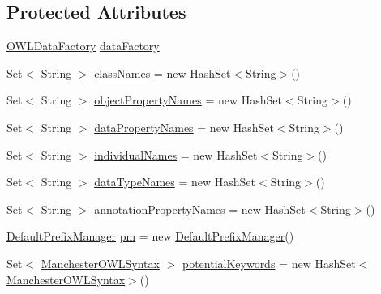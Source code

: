 \subsection*{Protected Attributes}
\begin{DoxyCompactItemize}
\item 
\hyperlink{interfaceorg_1_1semanticweb_1_1owlapi_1_1model_1_1_o_w_l_data_factory}{O\-W\-L\-Data\-Factory} \hyperlink{classorg_1_1coode_1_1owlapi_1_1manchesterowlsyntax_1_1_manchester_o_w_l_syntax_editor_parser_a6ed6a350d1607a65f8e3cda16cbbd3ca}{data\-Factory}
\item 
Set$<$ String $>$ \hyperlink{classorg_1_1coode_1_1owlapi_1_1manchesterowlsyntax_1_1_manchester_o_w_l_syntax_editor_parser_ac2ca29eba11aa2774f9d418efcf2a822}{class\-Names} = new Hash\-Set$<$String$>$()
\item 
Set$<$ String $>$ \hyperlink{classorg_1_1coode_1_1owlapi_1_1manchesterowlsyntax_1_1_manchester_o_w_l_syntax_editor_parser_adaac3c2c8be2c97a554f2323070d7932}{object\-Property\-Names} = new Hash\-Set$<$String$>$()
\item 
Set$<$ String $>$ \hyperlink{classorg_1_1coode_1_1owlapi_1_1manchesterowlsyntax_1_1_manchester_o_w_l_syntax_editor_parser_abc430c7ea3d59c3cbe2691937e034d05}{data\-Property\-Names} = new Hash\-Set$<$String$>$()
\item 
Set$<$ String $>$ \hyperlink{classorg_1_1coode_1_1owlapi_1_1manchesterowlsyntax_1_1_manchester_o_w_l_syntax_editor_parser_a0335c7a3b25dcbc964c0533b8c14530d}{individual\-Names} = new Hash\-Set$<$String$>$()
\item 
Set$<$ String $>$ \hyperlink{classorg_1_1coode_1_1owlapi_1_1manchesterowlsyntax_1_1_manchester_o_w_l_syntax_editor_parser_a441bbd618ac6df19f112b5de88f98ff2}{data\-Type\-Names} = new Hash\-Set$<$String$>$()
\item 
Set$<$ String $>$ \hyperlink{classorg_1_1coode_1_1owlapi_1_1manchesterowlsyntax_1_1_manchester_o_w_l_syntax_editor_parser_a98b7e364e39aba43494254739e4ef1dd}{annotation\-Property\-Names} = new Hash\-Set$<$String$>$()
\item 
\hyperlink{classorg_1_1semanticweb_1_1owlapi_1_1util_1_1_default_prefix_manager}{Default\-Prefix\-Manager} \hyperlink{classorg_1_1coode_1_1owlapi_1_1manchesterowlsyntax_1_1_manchester_o_w_l_syntax_editor_parser_ae7b720872be0d8e03b4e912c820b989b}{pm} = new \hyperlink{classorg_1_1semanticweb_1_1owlapi_1_1util_1_1_default_prefix_manager}{Default\-Prefix\-Manager}()
\item 
Set$<$ \hyperlink{enumorg_1_1coode_1_1owlapi_1_1manchesterowlsyntax_1_1_manchester_o_w_l_syntax}{Manchester\-O\-W\-L\-Syntax} $>$ \hyperlink{classorg_1_1coode_1_1owlapi_1_1manchesterowlsyntax_1_1_manchester_o_w_l_syntax_editor_parser_a8d369db1fab69d6a16d474d0dbb9ce39}{potential\-Keywords} = new Hash\-Set$<$\hyperlink{enumorg_1_1coode_1_1owlapi_1_1manchesterowlsyntax_1_1_manchester_o_w_l_syntax}{Manchester\-O\-W\-L\-Syntax}$>$()
\end{DoxyCompactItemize}
